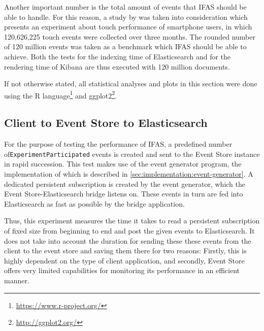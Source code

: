 Another important number is the total amount of events that \ac{IFAS} should be able to handle.
For this reason, a study by \citet{Henze2011} was taken into consideration which presents an experiment about touch performance of smartphone users, in which 120,626,225 touch events were collected over three months.
The rounded number of 120 million events was taken as a benchmark which \ac{IFAS} should be able to achieve.
Both the tests for the indexing time of Elasticsearch and for the rendering time of Kibana are thus executed with 120 million documents.

If not otherwise stated, all statistical analyses and plots in this section were done using the R language\footnote{\url{https://www.r-project.org/}} and ggplot2\footnote{\url{http://ggplot2.org/}}.

\subsection{Client to Event Store to Elasticsearch}
\label{subsec:evaluation:performance:evt-es-bridge}

For the purpose of testing the performance of \ac{IFAS}, a predefined number of\linebreak \texttt{ExperimentParticipated} events is created and sent to the Event Store instance in rapid succession.
This test makes use of the event generator program, the implementation of which is described in \cref{sec:implementation:event-generator}.
A dedicated persistent subscription is created by the event generator, which the Event Store-Elasticsearch bridge listens on.
These events in turn are fed into Elasticsearch as fast as possible by the bridge application.

Thus, this experiment measures the time it takes to read a persistent subscription of fixed size from beginning to end and post the given events to Elasticsearch.
It does not take into account the duration for sending these these events from the client to the event store and saving them there for two reasons:
Firstly, this is highly dependent on the type of client application, and secondly, Event Store offers very limited capabilities for monitoring its performance in an efficient manner.

